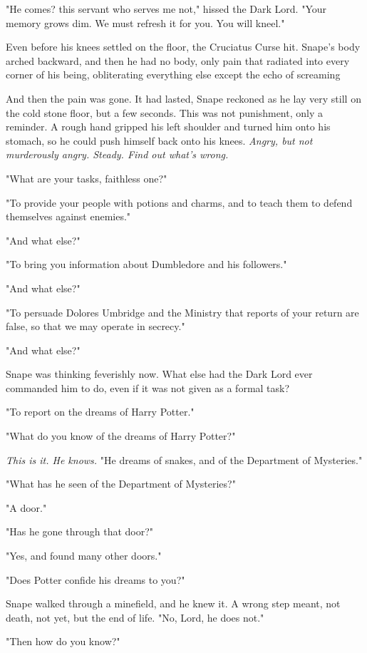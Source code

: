 "He comes? this servant who serves me not," hissed the Dark Lord. "Your memory grows dim. We must refresh it for you. You will kneel."

Even before his knees settled on the floor, the Cruciatus Curse hit. Snape's body arched backward, and then he had no body, only pain that radiated into every corner of his being, obliterating everything else except the echo of screaming{\el}

And then the pain was gone. It had lasted, Snape reckoned as he lay very still on the cold stone floor, but a few seconds. This was not punishment, only a reminder. A rough hand gripped his left shoulder and turned him onto his stomach, so he could push himself back onto his knees. \emph{Angry, but not murderously angry. Steady. Find out what's wrong.}

"What are your tasks, faithless one?"

"To provide your people with potions and charms, and to teach them to defend themselves against enemies."

"And what else?"

"To bring you information about Dumbledore and his followers."

"And what else?"

"To persuade Dolores Umbridge and the Ministry that reports of your return are false, so that we may operate in secrecy."

"And what else?"

Snape was thinking feverishly now. What else had the Dark Lord ever commanded him to do, even if it was not given as a formal task?

"To report on the dreams of Harry Potter."

"What do you know of the dreams of Harry Potter?"

\emph{This is it. He knows.} "He dreams of snakes, and of the Department of Mysteries."

"What has he seen of the Department of Mysteries?"

"A door."

"Has he gone through that door?"

"Yes, and found many other doors."

"Does Potter confide his dreams to you?"

Snape walked through a minefield, and he knew it. A wrong step meant, not death, not yet, but the end of life. "No, Lord, he does not."

"Then how do you know?"


